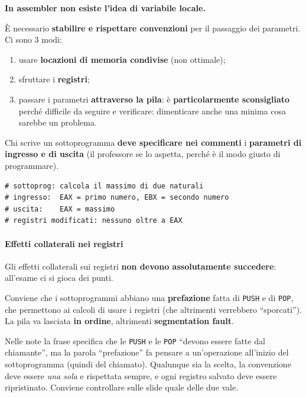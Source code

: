 \documentclass[11pt,a4paper]{article}
\begin{document}
\textbf{In assembler non esiste l'idea di variabile locale.}

È necessario \textbf{stabilire e rispettare convenzioni} per il passaggio dei parametri. Ci sono 3 modi:
\begin{enumerate}[leftmargin=*]
  \item usare \textbf{locazioni di memoria condivise} (non ottimale);
  \item sfruttare i \textbf{registri};
  \item passare i parametri \textbf{attraverso la pila}: è \textbf{particolarmente sconsigliato} perché difficile da seguire e verificare: dimenticare anche una minima cosa sarebbe un problema.
\end{enumerate}

Chi scrive un sottoprogramma \textbf{deve specificare nei commenti} i \textbf{parametri di ingresso e di uscita} (il professore se lo aspetta, perché è il modo giusto di programmare).

\begin{integrazione}
\begin{lstlisting}
# sottoprog: calcola il massimo di due naturali
# ingresso:  EAX = primo numero, EBX = secondo numero
# uscita:    EAX = massimo
# registri modificati: nessuno oltre a EAX
\end{lstlisting}
\end{integrazione}

\paragraph*{Effetti collaterali nei registri}

Gli effetti collaterali sui registri \textbf{non devono assolutamente succedere}: all'esame ci si gioca dei punti.

Conviene che i sottoprogrammi abbiano una \textbf{prefazione} fatta di \texttt{PUSH} e di \texttt{POP}, che permettono ai calcoli di usare i registri (che altrimenti verrebbero ``sporcati''). La pila va lasciata \textbf{in ordine}, altrimenti \textbf{segmentation fault}.

\begin{nota}[Da verificare]
Nelle note la frase specifica che le \texttt{PUSH} e le \texttt{POP} ``devono essere fatte dal chiamante'', ma la parola ``prefazione'' fa pensare a un'operazione all'inizio del sottoprogramma (quindi del chiamato). Qualunque sia la scelta, la convenzione deve essere \emph{una sola} e rispettata sempre, e ogni registro salvato deve essere ripristinato. Conviene controllare sulle slide quale delle due vale.
\end{nota}
\end{document}
